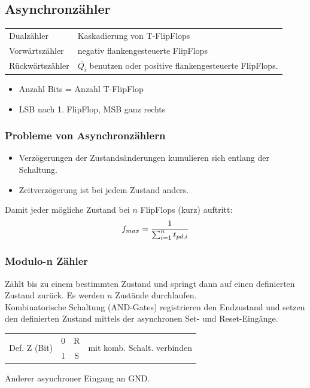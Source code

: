 \subsection{Asynchronzähler}
\begin{flushleft}
    \begin{tabular}{l p{40mm}}
        Dualzähler & Kaskadierung von T-FlipFlops\\
        Vorwärtszähler & negativ flankengesteuerte FlipFlops\\
        Rückwärtszähler & $\overline{Q_i}$ benutzen oder positive flankengesteuerte FlipFlops.
    \end{tabular}
\end{flushleft}
\begin{itemize}
    \item Anzahl Bits = Anzahl T-FlipFlop
    \item LSB nach 1. FlipFlop, MSB ganz rechts
\end{itemize}
\subsubsection{Probleme von Asynchronzählern}
\begin{itemize}
    \item Verzögerungen der Zustandsänderungen kumulieren sich entlang der Schaltung.
    \item Zeitverzögerung ist bei jedem Zustand anders.
\end{itemize}
Damit jeder mögliche Zustand bei $n$ FlipFlops (kurz) auftritt:
\begin{equation*}
    f_{max} = \frac{1}{\sum\displaylimits_{i=1}^n t_{pd,i}}
\end{equation*}

\subsubsection{Modulo-n Zähler}
Zählt bis zu einem bestimmten Zustand und springt dann auf einen definierten Zustand zurück. Es werden $n$ Zustände durchlaufen.\\
Kombinatorische Schaltung (AND-Gates) registrieren den Endzustand und setzen den definierten Zustand mittels der asynchronen Set- und Reset-Eingänge.
\begin{flushleft}
    \begin{tabular}{l c c l}
        \multirow{2}{*}{Def. Z (Bit)} & 0 & R & \multirow{2}{*}{mit komb. Schalt. verbinden}\\
        & 1 & S &
    \end{tabular}
\end{flushleft}
Anderer asynchroner Eingang an GND.

